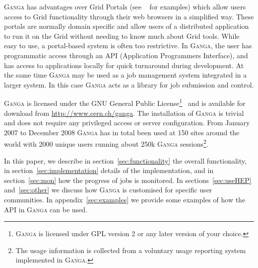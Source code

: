 \documentclass{elsart}
\def\ganga {\textsc{Ganga}\xspace}
\def\grid {Grid\xspace}
\begin{document}
\ganga has advantages over \grid Portals (see ~\cite{AHE,LEAD} for
examples) which allow users access to \grid functionality through
their web browsers in a simplified way. These portals are normally
domain specific and allow users of a distributed application to run it
on the \grid without needing to know much about \grid tools. While
easy to use, a portal-based system is often too restrictive.  In
\ganga, the user has programmatic access through an API (Application
Programmers Interface), and has access to applications locally for
quick turnaround during development. At the same time \ganga may be
used as a job management system integrated in a larger system. In this
case \ganga acts as a library for job submission and control.

\ganga is licensed under the GNU General Public
License\footnote{\ganga is licensed under GPL version 2 or any later version
  of your choice.}~\cite{GPL} and is available for download from
\url{http://www.cern.ch/ganga}. The installation of \ganga is trivial and
does not require any privileged access or server configuration. 
From January 2007 to December 2008 \ganga has in total been
used at 150 sites around the world with 2000 unique users running about 250k %
\ganga sessions\footnote{The usage information is collected from a voluntary
  usage reporting system implemented in \ganga.}.

In this paper, we describe in section~\ref{sec:functionality} the overall
functionality, in section~\ref{sec:implementation} details of the
implementation, and in section~\ref{sec:mon} how the progress of jobs is
monitored. In sections~\ref{sec:useHEP} and~\ref{sec:other} we discuss how
\ganga is customised for specific user communities. In
appendix~\ref{sec:examples} we provide some examples of how the API in \ganga
can be used.
\end{document}
